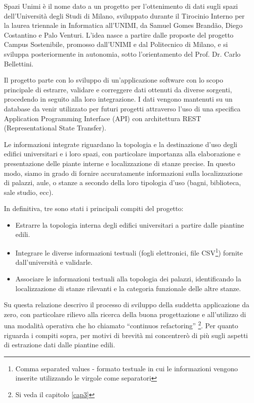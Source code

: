 \documentclass[12pt]{report}
\begin{document}
Spazi Unimi è il nome dato a un progetto per l'ottenimento di dati sugli spazi dell’Università degli Studi di Milano, sviluppato durante il Tirocinio Interno per la laurea triennale in Informatica all’UNIMI, da Samuel Gomes Brandão, Diego Costantino e Palo Venturi. L'idea nasce a partire dalle proposte del progetto Campus Sostenibile, promosso dall’UNIMI e dal Politecnico di Milano, e si sviluppa posteriormente in autonomia, sotto l'orientamento del Prof. Dr. Carlo Bellettini.

Il progetto parte con lo sviluppo di un'applicazione software con lo scopo principale di estrarre, validare e correggere dati ottenuti da diverse sorgenti, procedendo in seguito alla loro integrazione. I dati vengono mantenuti su un database da venir utilizzato per futuri progetti attraverso l'uso di una specifica Application Programming Interface (API) con architettura REST (Representational State Transfer). 

Le informazioni integrate riguardano la topologia e la destinazione d'uso degli edifici universitari e i loro spazi, con particolare importanza alla elaborazione e presentazione delle piante interne e localizzazione di stanze precise. In questo modo, siamo in grado di fornire accuratamente informazioni sulla localizzazione di palazzi, aule, o stanze a secondo della loro tipologia d'uso (bagni, biblioteca, sale studio, ecc).

In definitiva, tre sono stati i principali compiti del progetto:
\begin{itemize}
  \item Estrarre la topologia interna degli edifici universitari a partire dalle piantine edili.
  \item Integrare le diverse informazioni testuali (fogli elettronici, file CSV\footnote{Comma separated values - formato testuale in cui le informazioni vengono inserite utilizzando le virgole come separatori}) fornite dall'università e validarle.
  \item Associare le informazioni testuali alla topologia dei palazzi, identificando la localizzazione di stanze rilevanti e la categoria funzionale delle altre stanze.
\end{itemize}

Su questa relazione descrivo il processo di sviluppo della suddetta applicazione da zero, con particolare rilievo alla ricerca della buona progettazione e all'utilizzo di una modalità operativa che ho chiamato “continuos refactoring” \footnote{Si veda il capitolo \ref{cap3}}. Per quanto riguarda i compiti sopra, per motivi di brevità mi concentrerò di più sugli aspetti di estrazione dati dalle piantine edili.
\end{document}
